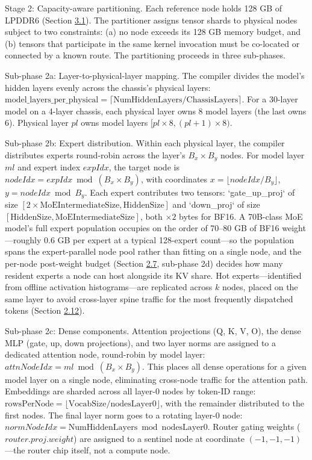 \documentclass[10pt,twocolumn]{article}
\begin{document}
Stage 2: Capacity-aware partitioning. Each reference node holds 128 GB of LPDDR6 (Section \hyperref[sec:3.1]{3.1}). The partitioner assigns tensor shards to physical nodes subject to two constraints: (a) no node exceeds its 128 GB memory budget, and (b) tensors that participate in the same kernel invocation must be co-located or connected by a known route. The partitioning proceeds in three sub-phases.

Sub-phase 2a: Layer-to-physical-layer mapping. The compiler divides the model's hidden layers evenly across the chassis's physical layers: $\mathrm{model\_layers\_per\_physical} = \lceil \mathrm{NumHiddenLayers} / \mathrm{ChassisLayers} \rceil$. For a 30-layer model on a 4-layer chassis, each physical layer owns 8 model layers (the last owns 6). Physical layer $pl$ owns model layers $[pl \times 8, (pl+1) \times 8)$.

Sub-phase 2b: Expert distribution. Within each physical layer, the compiler distributes experts round-robin across the layer's $B_x \times B_y$ nodes. For model layer $ml$ and expert index $expIdx$, the target node is $nodeIdx = expIdx \bmod (B_x \times B_y)$, with coordinates $x = \lfloor nodeIdx / B_y \rfloor$, $y = nodeIdx \bmod B_y$. Each expert contributes two tensors: `gate\_up\_proj` of size $[2 \times \mathrm{MoEIntermediateSize}, \mathrm{HiddenSize}]$ and `down\_proj` of size $[\mathrm{HiddenSize}, \mathrm{MoEIntermediateSize}]$, both $\times 2$ bytes for BF16. A 70B-class MoE model's full expert population occupies on the order of 70--80 GB of BF16 weight---roughly 0.6 GB per expert at a typical 128-expert count---so the population spans the expert-parallel node pool rather than fitting on a single node, and the per-node post-weight budget (Section \hyperref[sec:2.7]{2.7}, sub-phase 2d) decides how many resident experts a node can host alongside its KV share. Hot experts---identified from offline activation histograms---are replicated across $k$ nodes, placed on the same layer to avoid cross-layer spine traffic for the most frequently dispatched tokens (Section \hyperref[sec:2.12]{2.12}).

Sub-phase 2c: Dense components. Attention projections (Q, K, V, O), the dense MLP (gate, up, down projections), and two layer norms are assigned to a dedicated attention node, round-robin by model layer: $attnNodeIdx = ml \bmod (B_x \times B_y)$. This places all dense operations for a given model layer on a single node, eliminating cross-node traffic for the attention path. Embeddings are sharded across all layer-0 nodes by token-ID range: $\mathrm{rowsPerNode} = \lfloor \mathrm{VocabSize} / \mathrm{nodesLayer0} \rfloor$, with the remainder distributed to the first nodes. The final layer norm goes to a rotating layer-0 node: $normNodeIdx = \mathrm{NumHiddenLayers} \bmod \mathrm{nodesLayer0}$. Router gating weights ($router.proj.weight$) are assigned to a sentinel node at coordinate $(-1, -1, -1)$---the router chip itself, not a compute node.
\end{document}
